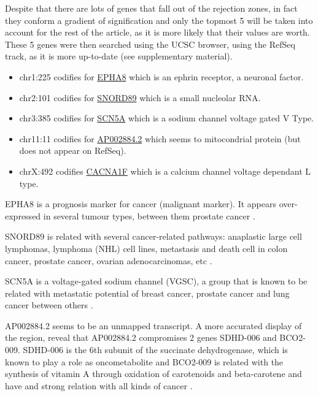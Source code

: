 \documentclass[9pt,twocolumn,twoside]{gsajnl}
\begin{document}
Despite that there are lots of genes that fall out of the rejection zones, in fact they conform a gradient of signification and only the topmost 5 will be taken into account for the rest of the article, as it is more likely that their values are worth. These 5 genes were then searched using the UCSC browser, using the RefSeq track, as it is more up-to-date (see supplementary material).

\begin{itemize}
\item chr1:225 codifies for \href{http://www.genecards.org/cgi-bin/carddisp.pl?gene=EPHA8}{EPHA8} which is an ephrin receptor, a neuronal factor.
\item chr2:101 codifies for \href{http://www.genecards.org/cgi-bin/carddisp.pl?gene=SNORD89}{SNORD89} which is a small nucleolar RNA.
\item chr3:385 codifies for \href{http://www.genecards.org/cgi-bin/carddisp.pl?gene=SCN5A}{SCN5A} which is a sodium channel voltage gated V Type.
\item chr11:11 codifies for \href{http://www.ensembl.org/Homo_sapiens/Gene/Summary?g=ENSG00000255292;r=11:112086903-112193805}{AP002884.2} which seems to mitocondrial protein (but does not appear on RefSeq).
\item chrX:492 codifies \href{http://www.genecards.org/cgi-bin/carddisp.pl?gene=CACNA1F}{CACNA1F} which is a calcium channel voltage dependant L type.
\end{itemize}

EPHA8 is a prognosis marker for cancer (malignant marker). It appears over-expressed in several tumour types, between them prostate cancer \cite{proteinatlas,uhlen2015tissue}.

SNORD89 is related with several cancer-related pathways:  anaplastic large cell lymphomas, lymphoma (NHL) cell lines, metastasis and death cell in colon cancer, prostate cancer, ovarian adenocarcinomas, etc \cite{tcng}.

SCN5A is a voltage-gated sodium channel (VGSC), a group that is known to be related with metastatic potential of breast cancer, prostate cancer and lung cancer between others \cite{Nelson2015}.

AP002884.2 seems to be an unmapped transcript. A more accurated display of the region, reveal that AP002884.2 compromises 2 genes SDHD-006 and BCO2-009. SDHD-006 is the 6th subunit of the succinate dehydrogenase, which is known to play a role as oncometabolite \cite{oncometabolites} and BCO2-009 is related with the synthesis of vitamin A through oxidation of carotenoids  and beta-carotene and have and strong relation with all kinds of cancer \cite{proteinatlas,uhlen2015tissue}.
\end{document}
